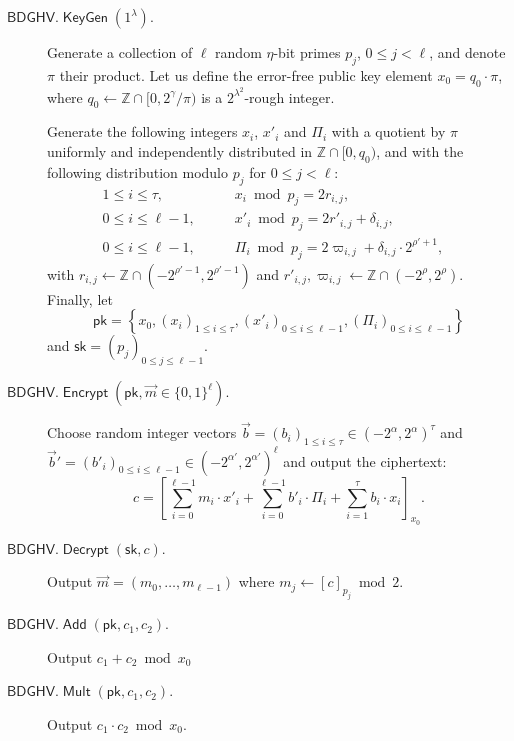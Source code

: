 \documentclass{llncs}
\renewcommand\leq\leqslant
\newcommand{\Z}{{\mathbb Z}}
\DeclareMathOperator{\KeyGen}{\ensuremath{\mathsf{KeyGen}}}
\DeclareMathOperator{\Encrypt}{\ensuremath{\mathsf{Encrypt}}}
\DeclareMathOperator{\Decrypt}{\ensuremath{\mathsf{Decrypt}}}
\DeclareMathOperator{\Add}{\ensuremath{\mathsf{Add}}}
\DeclareMathOperator{\Mult}{\ensuremath{\mathsf{Mult}}}
\newcommand*{\pk}{\ensuremath{\mathsf{pk}}}
\newcommand*{\sk}{\ensuremath{\mathsf{sk}}}
\newcommand*{\BDGHV}{\ensuremath{\mathsf{BDGHV}}}
\begin{document}
\begin{description}
\item[$\BDGHV.\KeyGen(1^\lambda)$.] Generate a collection of $\ell$
random $\eta$-bit primes $p_j$, $0\leq j<\ell$, and denote $\pi$
their product. Let us define the error-free public key element
$x_0=q_0\cdot\pi$, where $q_0 \leftarrow \Z \cap [0,2^{\gamma}/\pi)$
  is a $2^{\lambda^2}$-rough integer.

  Generate the following integers $x_i$, $x'_i$ and $\varPi_i$ with a quotient by $\pi$ uniformly
  and independently distributed in $\Z\cap [0, q_0)$, and with the
    following distribution modulo $p_j$ for $0 \leq j < \ell$:
$$
\begin{array}{lll}
1 \leq i \leq \tau, & \qquad x_i\bmod p_j = 2r_{i,j},& \\[.2cm]

0\leq i\leq \ell-1, & \qquad x'_i\bmod p_j = 2r'_{i,j}+\delta_{i,j},& \\[.2cm]

0\leq i\leq \ell-1, & \qquad \varPi_i \bmod p_j = 2\varpi_{i,j} +
\delta_{i,j}\cdot 2^{\rho'+1},
\end{array}
$$
with $r_{i,j}\leftarrow\Z\cap(-2^{\rho'-1}, 2^{\rho'-1})$ and $r'_{i,j}, \varpi_{i,j}\leftarrow\Z\cap(-2^{\rho}, 2^{\rho})$. Finally, let 
$$\pk = \left\{ x_0, \left(x_i\right)_{1\leq i\leq \tau}, \left(x'_i\right)_{0\leq i\leq \ell-1}, \left(\varPi_i\right)_{0\leq i\leq {\ell-1}}\right\}$$
and $\sk=(p_j)_{0\leq j\leq {\ell-1}}$.

\item[$\BDGHV.\Encrypt(\pk, \vec{m} \in \{0,1\}^\ell)$.] Choose 
  random integer vectors $\vec b=(b_i)_{1\leq i\leq \tau}
  \in(-2^\alpha,2^{\alpha})^\tau$ and $\vec b'=(b'_i)_{0\leq i\leq
      \ell-1} \in(-2^{\alpha'},2^{\alpha'})^{\ell}$ 
and output the ciphertext:
\begin{equation}
\label{eq:encbdghv}
c = \left[\sum\limits_{i=0}^{\ell-1} m_i \cdot x'_i + 
	\sum_{i=0}^{\ell-1} b'_i\cdot \varPi_i  + \sum_{i=1}^\tau 
b_i\cdot x_i\right]_{x_0}.
\end{equation}
\item[$\BDGHV.\Decrypt(\sk, c)$.] Output $\vec{m}=(m_0,\ldots,m_{\ell-1})$ where $m_j \leftarrow [c]_{p_j} \bmod 2$.
\\\vspace{-0.25cm}
\item[$\BDGHV.\Add(\pk, c_1, c_2)$.] Output $c_1+c_2 \bmod x_0$
\\\vspace{-0.25cm}
\item[$\BDGHV.\Mult(\pk, c_1, c_2)$.] Output $c_1 \cdot c_2 \bmod x_0$.
\end{description}
\end{document}
